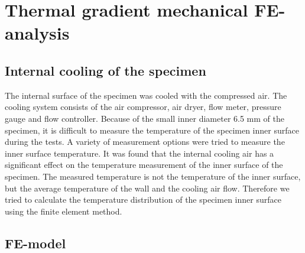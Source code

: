 \documentclass[preprint,5p,twocolumn,11pt,sort&compress]{elsarticle}
\begin{document}
\section{Thermal gradient mechanical FE-analysis}

\subsection{Internal cooling of the specimen}

The internal surface of the specimen was cooled with the compressed air. The cooling system consists of the air compressor, air dryer, flow meter, pressure gauge and flow controller.
Because of the small inner diameter 6.5 mm of the specimen, it is difficult to measure the temperature of the specimen inner surface during the tests. 
A variety of measurement options were tried to measure the inner surface temperature.
It was found that the internal cooling air has a significant effect on the temperature measurement of the inner surface of the specimen.
The measured temperature is not the temperature of the inner surface, but the average temperature of the wall and the cooling air flow.
Therefore we tried to calculate the temperature distribution of the specimen inner surface using the finite element method.


\subsection{FE-model}
\end{document}
